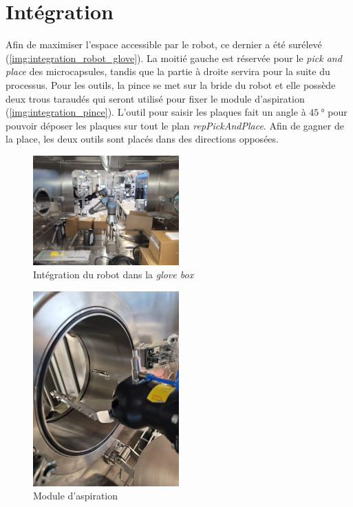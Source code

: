 \section{Intégration}
Afin de maximiser l'espace accessible par le robot, ce dernier a été surélevé (\cf \autoref{img:integration_robot_glove}). La moitié gauche est réservée pour le \textit{pick and place} des microcapsules, tandis que la partie à droite servira pour la suite du processus.
Pour les outils, la pince se met sur la bride du robot et elle possède deux trous taraudés qui seront utilisé pour fixer le module d'aspiration (\cf \autoref{img:integration_pince}).
L'outil pour saisir les plaques fait un angle à $\qty{45}{\degree}$ pour pouvoir déposer les plaques sur tout le plan \textit{repPickAndPlace}. Afin de gagner de la place, les deux outils sont placés dans des directions opposées.
\begin{figure}[ht]
    \centering
    \includegraphics[width = 0.5\textwidth]{assets/figures/Hardware/gloveBox.jpeg}
    \caption{Intégration du robot dans la \textit{glove box}}
    \label{img:integration_robot_glove}
\end{figure}
\begin{figure}[ht]
    \centering
    \includegraphics[width = 0.5\textwidth]{assets/figures/Hardware/outil_complet.jpeg}
    \caption{Module d'aspiration}
    \label{img:integration_pince}
\end{figure}
